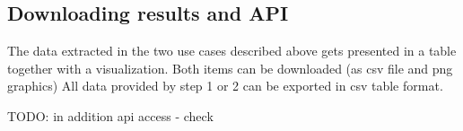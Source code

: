 \subsection{Downloading results and API}

The data extracted in the two use cases described above gets presented in a table together with a visualization. Both items can be downloaded (as csv file and png graphics)
All data provided by step 1 or 2 can be exported in csv table format. 

TODO: in addition api access - check